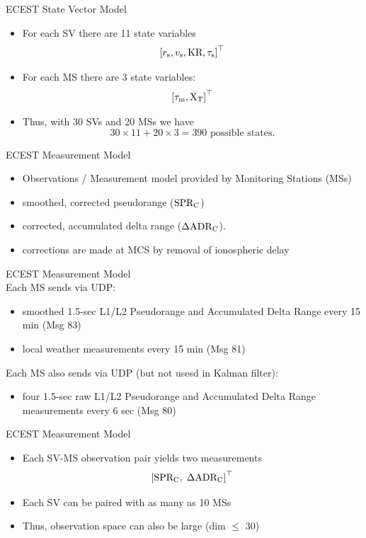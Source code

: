 \documentclass{beamer}
\begin{document}
\begin{frame}
ECEST State Vector Model\\
 \begin{itemize}
 \item For each SV there are 11 state variables
\[\left[ r_\text{s}, v_\text{s}, \text{KR}, \tau_\text{s} \right]^\top\]
 \item For each MS there are 3 state variables:
\[ \left[\tau_\text{m}, \text{X}_\text{T} \right]^\top\]
 \item Thus, with 30 SVs and 20 MSs we have 
\[30\times 11 + 20\times 3 = 390 \text{ possible states.}\]
 \end{itemize}
\end{frame}


\begin{frame}
ECEST Measurement Model\\
 \begin{itemize}
 \item Observations / Measurement model provided by Monitoring Stations (MSs)
 \item smoothed, corrected pseudorange ($\text{SPR}_\text{C}$)
 \item corrected, accumulated delta range ($\Delta\text{ADR}_\text{C}$). 
 \item corrections are made at MCS by removal of ionospheric delay
\end{itemize}
\end{frame}

\begin{frame}
ECEST Measurement Model\\
Each MS sends via UDP:
\begin{itemize}
 \item smoothed 1.5-sec L1/L2 Pseudorange and Accumulated Delta Range 
        every 15 min (Msg 83) 
 \item local weather measurements every 15 min (Msg 81)
 \end{itemize}
Each MS also sends via UDP (but not usesd in Kalman filter):
 \begin{itemize}
   \item four 1.5-sec raw L1/L2 Pseudorange and Accumulated Delta Range
  measurements every 6 sec (Msg 80)
\end{itemize}
\end{frame}

\begin{frame}
ECEST Measurement Model\\
 \begin{itemize}
 \item Each SV-MS observation pair yields two measurements
\[\left[\text{SPR}_\text{C},\; \Delta\text{ADR}_\text{C}\right]^\top\]
 \item Each SV can be paired with as many as 10 MSs
 \item Thus, observation space can also be large (dim $\leq$  30)
\end{itemize}
\end{frame}
\end{document}
